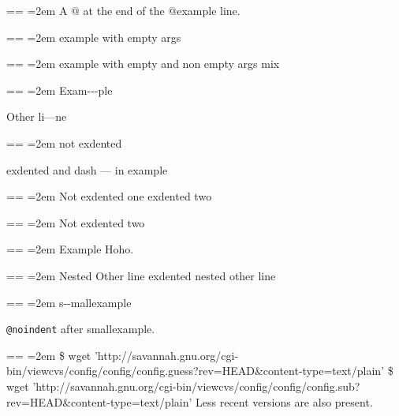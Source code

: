 \documentclass{book}
\makeatletter
\newenvironment{GNUTexinfopreformatted}{%
  \par\obeylines\obeyspaces\frenchspacing
  \parskip=\z@\parindent=\z@}{}
\makeatother
\begin{document}
\begin{titlepage}
\begin{GNUTexinfopreformatted}
\leftskip=2em\relax\ttfamily%
A @ at the end of the @example line.
\end{GNUTexinfopreformatted}

\begin{GNUTexinfopreformatted}
\leftskip=2em\relax\ttfamily%
example with empty args
\end{GNUTexinfopreformatted}

\begin{GNUTexinfopreformatted}
\leftskip=2em\relax\ttfamily%
example with empty and non empty args mix
\end{GNUTexinfopreformatted}

\begin{GNUTexinfopreformatted}
\leftskip=2em\relax\ttfamily%
Exam{-}{-}{-}ple

\end{GNUTexinfopreformatted}
\noindent Other li---ne
\begin{GNUTexinfopreformatted}
\leftskip=2em\relax\ttfamily%
not exdented
\end{GNUTexinfopreformatted}

\noindent exdented  and dash --- in example
\begin{GNUTexinfopreformatted}
\leftskip=2em\relax\ttfamily%
Not exdented one
\end{GNUTexinfopreformatted}
\noindent exdented two
\begin{GNUTexinfopreformatted}
\leftskip=2em\relax\ttfamily%
Not exdented two
\end{GNUTexinfopreformatted}

\begin{GNUTexinfopreformatted}
\leftskip=2em\relax\ttfamily%
Example   Hoho.
\end{GNUTexinfopreformatted}
\begin{GNUTexinfopreformatted}
\leftskip=2em\relax\ttfamily%
Nested Other line
\end{GNUTexinfopreformatted}
\noindent exdented nested other line

\begin{GNUTexinfopreformatted}
\leftskip=2em\relax\ttfamily\footnotesize%
s{-}{-}mallexample
\end{GNUTexinfopreformatted}

\texttt{@noindent} after smallexample.
\begin{GNUTexinfopreformatted}
\leftskip=2em\relax\ttfamily\footnotesize%
\$ wget 'http://savannah.gnu.org/cgi-bin/viewcvs/config/config/config.guess?rev=HEAD\&content-type=text/plain'
\$ wget 'http://savannah.gnu.org/cgi-bin/viewcvs/config/config/config.sub?rev=HEAD\&content-type=text/plain'
\end{GNUTexinfopreformatted}
\noindent{}Less recent versions are also present.


\end{titlepage}
\end{document}

